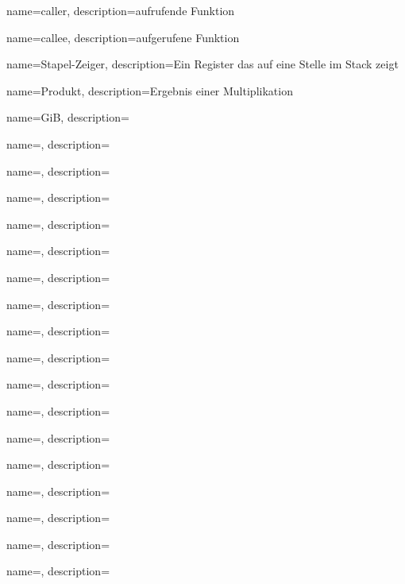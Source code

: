 {
  name=caller,
  description={aufrufende Funktion}
}

{
  name=callee,
  description={aufgerufene Funktion}
}

{
  name={Stapel-Zeiger},
  description={Ein Register das auf eine Stelle im Stack zeigt}
}

{
  name={Produkt},
  description={Ergebnis einer Multiplikation}
}

{
  name={GiB},
  description={\DEph{}}
}

{
  name={\DEph},
  description={\DEph{}}
}

{
  name={\DEph},
  description={\DEph{}}
}

{
  name={\DEph},
  description={\DEph{}}
}

{
  name={\DEph},
  description={\DEph{}}
}

{
  name={\DEph},
  description={\DEph{}}
}

{
  name={\DEph},
  description={\DEph{}}
}

{
  name={\DEph},
  description={\DEph{}}
}

{
  name={\DEph},
  description={\DEph{}}
}

{
  name={\DEph},
  description={\DEph{}}
}

{
  name={\DEph},
  description={\DEph{}}
}

{
  name={\DEph},
  description={\DEph{}}
}

{
  name={\DEph},
  description={\DEph{}}
}

{
  name={\DEph},
  description={\DEph{}}
}

{
  name={\DEph},
  description={\DEph{}}
}

{
  name={\DEph},
  description={\DEph{}}
}

{
  name={\DEph},
  description={\DEph{}}
}

{
  name={\DEph},
  description={\DEph{}}
}

